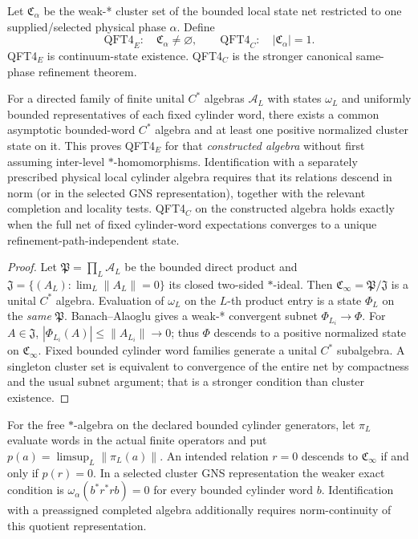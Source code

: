 \documentclass[12pt,a4paper]{article}
\begin{document}
\begin{definition}
\label{p12:def:v283-qft4-existence-canonicity}
Let \(\mathfrak C_\alpha\) be the weak-* cluster set of the bounded local state net restricted to one supplied/selected physical phase \(\alpha\).  Define
\[
 \mathrm{QFT4}_E:\quad \mathfrak C_\alpha\ne\varnothing,
 \qquad
 \mathrm{QFT4}_C:\quad |\mathfrak C_\alpha|=1.
\]
QFT4$_E$ is continuum-state existence.  QFT4$_C$ is the stronger canonical same-phase refinement theorem.
\end{definition}

\begin{theorem}
\label{p12:thm:v283-qft4-cluster-split}
For a directed family of finite unital $C^*$ algebras $\mathcal A_L$
with states $\omega_L$ and uniformly bounded representatives of each
fixed cylinder word, there exists a common asymptotic bounded-word
$C^*$ algebra and at least one positive normalized cluster state on it.
This proves QFT4$_E$ for that \emph{constructed algebra} without first
assuming inter-level $*$-homomorphisms.
Identification with a separately prescribed physical local cylinder algebra
requires that its relations descend in norm (or in the selected GNS
representation), together with the relevant completion and locality tests.
QFT4$_C$ on the constructed algebra holds exactly when the full net of
fixed cylinder-word expectations converges to a unique
refinement-path-independent state.
\end{theorem}
\begin{proof}
Let $\mathfrak P=\prod_L\mathcal A_L$ be the bounded direct product
and $\mathfrak J=\{(A_L):\lim_L\|A_L\|=0\}$ its closed two-sided
$*$-ideal. Then $\mathfrak C_\infty=\mathfrak P/\mathfrak J$ is a unital
$C^*$ algebra. Evaluation of $\omega_L$ on the $L$-th product entry
is a state $\Phi_L$ on the \emph{same} $\mathfrak P$.
Banach--Alaoglu gives a weak-* convergent subnet $\Phi_{L_i}\to\Phi$.
For $A\in\mathfrak J$, $|\Phi_{L_i}(A)|\le\|A_{L_i}\|\to0$;
thus $\Phi$ descends to a positive normalized state on
$\mathfrak C_\infty$. Fixed bounded cylinder word families generate
a unital $C^*$ subalgebra. A singleton cluster set is equivalent to
convergence of the entire net by compactness and the usual subnet
argument; that is a stronger condition than cluster existence.
\end{proof}
\begin{proposition}
\label{p12:prop:v382-cylinder-relation-descent}
For the free $*$-algebra on the declared bounded cylinder generators,
let $\pi_L$ evaluate words in the actual finite operators and put
$p(a)=\limsup_L\|\pi_L(a)\|$. An intended relation $r=0$ descends to
$\mathfrak C_\infty$ if and only if $p(r)=0$.
In a selected cluster GNS representation the weaker exact condition is
$\omega_\alpha(b^*r^*rb)=0$ for every bounded cylinder word $b$.
Identification with a preassigned completed algebra additionally
requires norm-continuity of this quotient representation.
\end{proposition}
\end{document}
